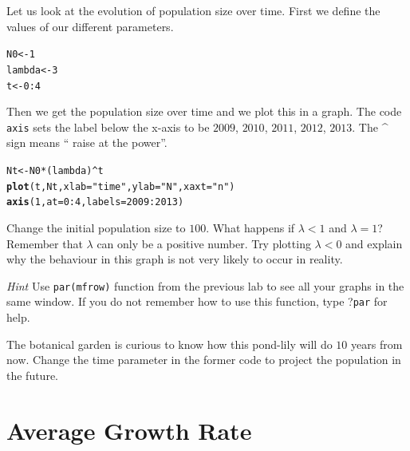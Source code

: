 \documentclass{article}\usepackage[]{graphicx}\usepackage[]{color}
\makeatletter
\newcommand{\hlnum}[1]{\textcolor[rgb]{0.686,0.059,0.569}{#1}}%
\newcommand{\hlstr}[1]{\textcolor[rgb]{0.192,0.494,0.8}{#1}}%
\newcommand{\hlopt}[1]{\textcolor[rgb]{0,0,0}{#1}}%
\newcommand{\hlstd}[1]{\textcolor[rgb]{0.345,0.345,0.345}{#1}}%
\newcommand{\hlkwb}[1]{\textcolor[rgb]{0.69,0.353,0.396}{#1}}%
\newcommand{\hlkwc}[1]{\textcolor[rgb]{0.333,0.667,0.333}{#1}}%
\newcommand{\hlkwd}[1]{\textcolor[rgb]{0.737,0.353,0.396}{\textbf{#1}}}%
\newenvironment{kframe}{%
 \def\at@end@of@kframe{}%
 \ifinner\ifhmode%
  \def\at@end@of@kframe{\end{minipage}}%
  \begin{minipage}{\columnwidth}%
 \fi\fi%
 \def\FrameCommand##1{\hskip\@totalleftmargin \hskip-\fboxsep
 \colorbox{shadecolor}{##1}\hskip-\fboxsep
     \hskip-\linewidth \hskip-\@totalleftmargin \hskip\columnwidth}%
 \MakeFramed {\advance\hsize-\width
   \@totalleftmargin\z@ \linewidth\hsize
   \@setminipage}}%
 {\par\unskip\endMakeFramed%
 \at@end@of@kframe}
\newenvironment{knitrout}{}{} %
\makeatother
\begin{document}
Let us look at the evolution of population size over time. First we define the values of our different parameters.
\begin{knitrout}
\color{fgcolor}\begin{kframe}
\begin{alltt}
\hlstd{N0} \hlkwb{<-} \hlnum{1}
\hlstd{lambda} \hlkwb{<-} \hlnum{3}
\hlstd{t}\hlkwb{<-}\hlnum{0}\hlopt{:}\hlnum{4}
\end{alltt}
\end{kframe}
\end{knitrout}
Then we get the population size over time and we plot this in a graph. The code \texttt{axis} sets the label below the x-axis to be $2009$, $2010$, $2011$, $2012$, $2013$. The \textasciicircum  \; sign means \textquotedblleft
raise at the power\textquotedblright.
\begin{knitrout}
\color{fgcolor}\begin{kframe}
\begin{alltt}
\hlstd{Nt}\hlkwb{<-}\hlstd{N0}\hlopt{*}\hlstd{(lambda)}\hlopt{^}\hlstd{t}
\hlkwd{plot}\hlstd{(t, Nt,}\hlkwc{xlab}\hlstd{=}\hlstr{"time"}\hlstd{,} \hlkwc{ylab}\hlstd{=}\hlstr{"N"}\hlstd{,} \hlkwc{xaxt} \hlstd{=} \hlstr{"n"}\hlstd{)}
\hlkwd{axis}\hlstd{(}\hlnum{1}\hlstd{,} \hlkwc{at}\hlstd{=}\hlnum{0}\hlopt{:}\hlnum{4}\hlstd{,} \hlkwc{labels}\hlstd{=}\hlnum{2009}\hlopt{:}\hlnum{2013}\hlstd{)}
\end{alltt}
\end{kframe}
\end{knitrout}
Change the initial population size to $100$. What happens if $\lambda<1$ and $\lambda=1$? Remember that $\lambda$ can only be a positive number. Try plotting $\lambda<0$ and explain why the behaviour in this graph is not very likely to occur in reality. 


 \textit{Hint} Use \texttt{par(mfrow)} function from the previous lab to see all your graphs in the same window. If you do not remember how to use this function, type ?\texttt{par} for help. 



The botanical garden is curious to know how this pond-lily will do $10$ years from now. Change the time parameter in the former code to project the population in the future. 

\section{Average Growth Rate}
\end{document}
